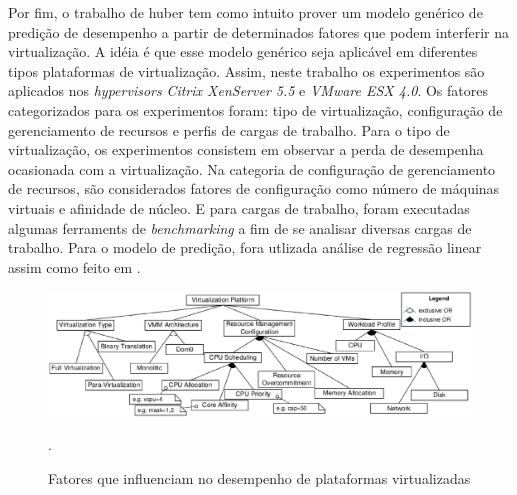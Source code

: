 Por fim, o trabalho de huber tem como intuito prover um modelo genérico de predição de desempenho a partir de determinados fatores que podem interferir na virtualização. A idéia é que esse modelo genérico seja aplicável em diferentes tipos plataformas de virtualização. Assim, neste trabalho os experimentos são aplicados nos \textit{hypervisors } \textit{Citrix XenServer 5.5} e \textit{VMware ESX 4.0}. Os fatores categorizados para os experimentos foram: tipo de virtualização, configuração de gerenciamento de recursos e perfis de cargas de trabalho. Para o tipo de virtualização, os experimentos consistem em observar a perda de desempenha ocasionada com a virtualização. Na categoria de configuração de gerenciamento de recursos, são considerados fatores de configuração como número de máquinas virtuais e afinidade de núcleo. E para cargas de trabalho, foram executadas algumas ferraments de \textit{benchmarking} a fim de se analisar diversas cargas de trabalho. Para o modelo de predição, fora utlizada análise de regressão linear assim como feito em .

\begin{figure}[!htb]
\centering
\includegraphics [keepaspectratio=true,scale=0.50]{figuras/factors_influence.eps}
\caption{Fatores que influenciam no desempenho de plataformas virtualizadas}
\cite{huber2011}.
\label{influence_factors}
\end{figure} 

